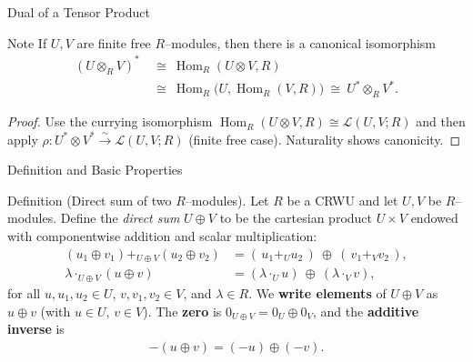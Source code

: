 \begin{frame}{Dual of a Tensor Product}
\begin{block}{Note}
If $U,V$ are finite free $R$–modules, then there is a canonical isomorphism
\begin{align*}
    (U\otimes_R V)^*\ &\cong\ \operatorname{Hom}_R(U\otimes V,R)\\\ &\cong\ \operatorname{Hom}_R\!\big(U,\operatorname{Hom}_R(V,R)\big)
\ \cong\ U^*\otimes_R V^*.
\end{align*}

\end{block}
\begin{proof}
Use the currying isomorphism $\operatorname{Hom}_R(U\otimes V,R)\cong \mathcal{L}(U,V;R)$ and then apply $\rho: U^*\otimes V^* \xrightarrow{\sim} \mathcal{L}(U,V;R)$ (finite free case). Naturality shows canonicity.
\end{proof}
\end{frame}


\begin{frame}{Definition and Basic Properties}
\begin{block}{Definition (Direct sum of two $R$–modules).}
Let $R$ be a CRWU and let $U,V$ be $R$–modules.
Define the \emph{direct sum} $U\oplus V$ to be the cartesian product $U\times V$ endowed with componentwise addition and scalar multiplication:
\begin{align*}
(u_1\oplus v_1) +_{U\oplus V} (u_2\oplus v_2) &= (\,u_1 +_{U} u_2\,)\ \oplus\ (\,v_1 +_{V} v_2\,),\\
\lambda\cdot_{U\oplus V} (u\oplus v) &= (\lambda\cdot_U u)\ \oplus\ (\lambda\cdot_V v),
\end{align*}
for all $u,u_1,u_2\in U$, $v,v_1,v_2\in V$, and $\lambda\in R$.
We \textbf{write elements} of $U\oplus V$ as $u\oplus v$ (with $u\in U$, $v\in V$).
The \textbf{zero} is $0_{U\oplus V}=0_U\oplus 0_V$, and the \textbf{additive inverse} is
\begin{align*}
-(u\oplus v)=(-u)\oplus(-v).
\end{align*}
\end{block}
\end{frame}

